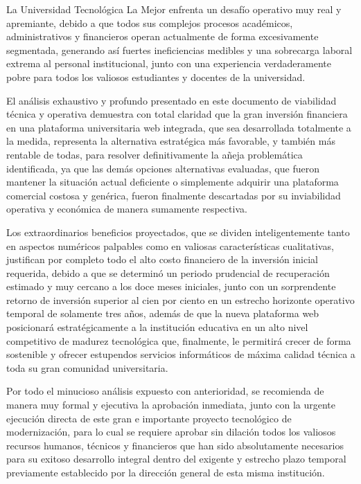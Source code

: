 \documentclass[11pt,spanish]{article}
\begin{document}
La Universidad Tecnológica La Mejor enfrenta un desafío operativo muy real y apremiante, debido a que todos sus complejos procesos académicos, administrativos y financieros operan actualmente de forma excesivamente segmentada, generando así fuertes ineficiencias medibles y una sobrecarga laboral extrema al personal institucional, junto con una experiencia verdaderamente pobre para todos los valiosos estudiantes y docentes de la universidad.

El análisis exhaustivo y profundo presentado en este documento de viabilidad técnica y operativa demuestra con total claridad que la gran inversión financiera en una plataforma universitaria web integrada, que sea desarrollada totalmente a la medida, representa la alternativa estratégica más favorable, y también más rentable de todas, para resolver definitivamente la añeja problemática identificada, ya que las demás opciones alternativas evaluadas, que fueron mantener la situación actual deficiente o simplemente adquirir una plataforma comercial costosa y genérica, fueron finalmente descartadas por su inviabilidad operativa y económica de manera sumamente respectiva.

Los extraordinarios beneficios proyectados, que se dividen inteligentemente tanto en aspectos numéricos palpables como en valiosas características cualitativas, justifican por completo todo el alto costo financiero de la inversión inicial requerida, debido a que se determinó un periodo prudencial de recuperación estimado y muy cercano a los doce meses iniciales, junto con un sorprendente retorno de inversión superior al cien por ciento en un estrecho horizonte operativo temporal de solamente tres años, además de que la nueva plataforma web posicionará estratégicamente a la institución educativa en un alto nivel competitivo de madurez tecnológica que, finalmente, le permitirá crecer de forma sostenible y ofrecer estupendos servicios informáticos de máxima calidad técnica a toda su gran comunidad universitaria.

Por todo el minucioso análisis expuesto con anterioridad, se recomienda de manera muy formal y ejecutiva la aprobación inmediata, junto con la urgente ejecución directa de este gran e importante proyecto tecnológico de modernización, para lo cual se requiere aprobar sin dilación todos los valiosos recursos humanos, técnicos y financieros que han sido absolutamente necesarios para su exitoso desarrollo integral dentro del exigente y estrecho plazo temporal previamente establecido por la dirección general de esta misma institución.
\end{document}
